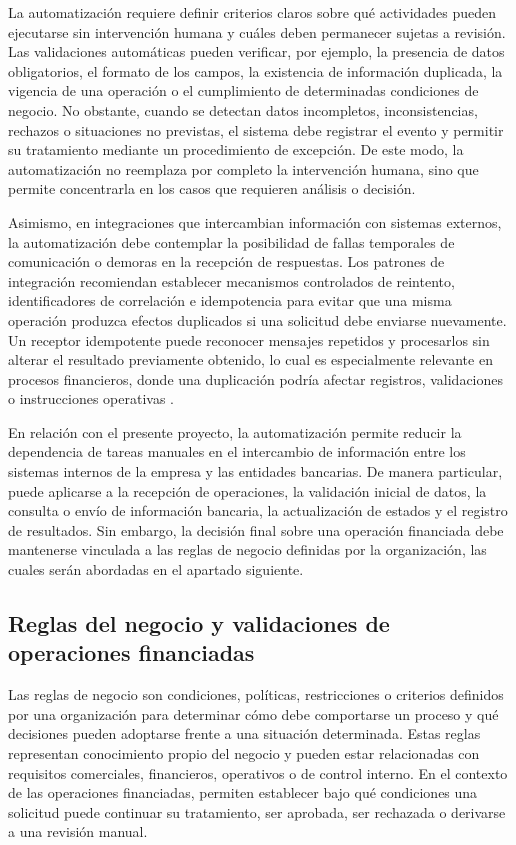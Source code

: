 La automatización requiere definir criterios claros sobre qué actividades pueden ejecutarse sin intervención humana y cuáles deben permanecer sujetas a revisión. Las validaciones automáticas pueden verificar, por ejemplo, la presencia de datos obligatorios, el formato de los campos, la existencia de información duplicada, la vigencia de una operación o el cumplimiento de determinadas condiciones de negocio. No obstante, cuando se detectan datos incompletos, inconsistencias, rechazos o situaciones no previstas, el sistema debe registrar el evento y permitir su tratamiento mediante un procedimiento de excepción. De este modo, la automatización no reemplaza por completo la intervención humana, sino que permite concentrarla en los casos que requieren análisis o decisión.

Asimismo, en integraciones que intercambian información con sistemas externos, la automatización debe contemplar la posibilidad de fallas temporales de comunicación o demoras en la recepción de respuestas. Los patrones de integración recomiendan establecer mecanismos controlados de reintento, identificadores de correlación e idempotencia para evitar que una misma operación produzca efectos duplicados si una solicitud debe enviarse nuevamente. Un receptor idempotente puede reconocer mensajes repetidos y procesarlos sin alterar el resultado previamente obtenido, lo cual es especialmente relevante en procesos financieros, donde una duplicación podría afectar registros, validaciones o instrucciones operativas \citep{hohpe2003}.

En relación con el presente proyecto, la automatización permite reducir la dependencia de tareas manuales en el intercambio de información entre los sistemas internos de la empresa y las entidades bancarias. De manera particular, puede aplicarse a la recepción de operaciones, la validación inicial de datos, la consulta o envío de información bancaria, la actualización de estados y el registro de resultados. Sin embargo, la decisión final sobre una operación financiada debe mantenerse vinculada a las reglas de negocio definidas por la organización, las cuales serán abordadas en el apartado siguiente.

\subsection{Reglas del negocio y validaciones de operaciones financiadas}

Las reglas de negocio son condiciones, políticas, restricciones o criterios definidos por una organización para determinar cómo debe comportarse un proceso y qué decisiones pueden adoptarse frente a una situación determinada. Estas reglas representan conocimiento propio del negocio y pueden estar relacionadas con requisitos comerciales, financieros, operativos o de control interno. En el contexto de las operaciones financiadas, permiten establecer bajo qué condiciones una solicitud puede continuar su tratamiento, ser aprobada, ser rechazada o derivarse a una revisión manual.

